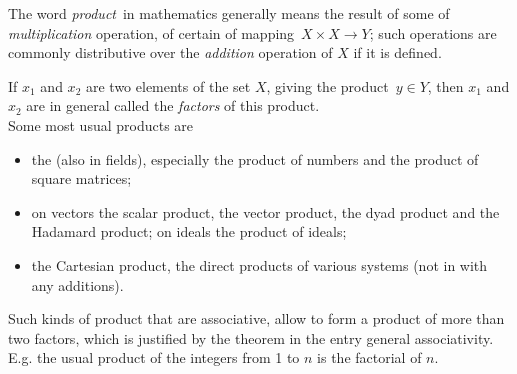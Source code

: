 \documentclass[12pt]{article}
\theoremstyle{definition}
\begin{document}

The word {\em product}\, in mathematics generally means the result of some  of {\em multiplication} operation,  of certain  of mapping\, $X\!\times\!X \rightarrow Y$; such operations are commonly distributive over the {\em addition} operation of $X$ if it is defined.

If $x_1$ and $x_2$ are two elements of the set $X$, giving the product\, $y\in Y$, then $x_1$ and $x_2$ are in general called the {\em factors} of this product.\\

Some most usual products are
\begin{itemize}
\item the  (also in fields), especially the product of numbers and the product of square matrices;
\item on vectors the scalar product, the vector product, the dyad product and the Hadamard product; on ideals the product of ideals;
\item the Cartesian product, the direct products of various systems (not in  with any additions).\\
\end{itemize}

Such kinds of product that are associative, allow to form a product of more than two factors, which is justified by the theorem in the entry general associativity.\, E.g. the usual product of the integers from 1 to $n$ is the factorial of $n$.


\end{document}
